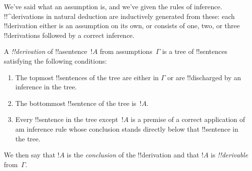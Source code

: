 \documentclass[../../../include/open-logic-section]{subfiles}
\begin{document}
      {}
      {}


\begin{explain}
We've said what an assumption is, and we've given the rules of
inference.  !!^{derivation}s in natural deduction are inductively
generated from these: each !!{derivation} either is an assumption
on its own, or consists of one, two, or three !!{derivation}s followed
by a correct inference.
\end{explain}

\begin{defn}[!!^{derivation}]
A \emph{!!{derivation}} of !!a{sentence}~$!A$ from assumptions~$\Gamma$
is a tree of !!{sentence}s satisfying the following conditions:
\begin{enumerate}
\item The topmost !!{sentence}s of the tree are either in $\Gamma$ or
  are !!{discharged} by an inference in the tree.
\item The bottommost !!{sentence} of the tree is~$!A$.
\item Every !!{sentence} in the tree except~$!A$ is a premise of a correct
  application of am inference rule whose conclusion stands directly
  below that !!{sentence} in the tree.
\end{enumerate}
We then say that $!A$ is the \emph{conclusion} of the
!!{derivation} and that $!A$ is \emph{!!{derivable}} from~$\Gamma$.
\end{defn}
\end{document}
